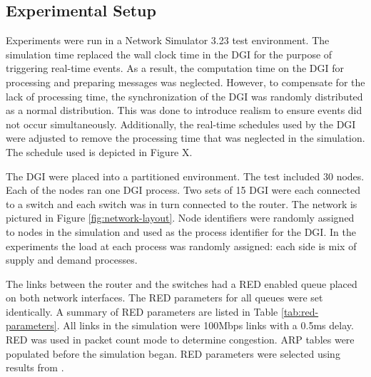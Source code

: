 \subsection{Experimental Setup}
\label{sect:experimentalsetup}

Experiments were run in a Network Simulator 3.23\cite{NS3} test environment.
The simulation time replaced the wall clock time in the \ac{DGI} for the purpose of triggering real-time events.
As a result, the computation time on the \ac{DGI} for processing and preparing messages was neglected.
However, to compensate for the lack of processing time, the synchronization of the \ac{DGI} was randomly distributed as a normal distribution.
This was done to introduce realism to ensure events did not occur simultaneously.
Additionally, the real-time schedules used by the \ac{DGI} were adjusted to remove the processing time that was neglected in the simulation.
The schedule used is depicted in Figure X.

The \ac{DGI} were placed into a partitioned environment.
The test included 30 nodes.
Each of the nodes ran one \ac{DGI} process.
Two sets of 15 \ac{DGI} were each connected to a switch and each switch was in turn connected to the router.
The network is pictured in Figure \ref{fig:network-layout}.
Node identifiers were randomly assigned to nodes in the simulation and used as the process identifier for the \ac{DGI}.
In the experiments the load at each process was randomly assigned: each side is mix of supply and demand processes.

The links between the router and the switches had a \ac{RED} enabled queue placed on both network interfaces.
The \ac{RED} parameters for all queues were set identically.
A summary of \ac{RED} parameters are listed in Table \ref{tab:red-parameters}.
All links in the simulation were 100Mbps links with a 0.5ms delay.
RED was used in packet count mode to determine congestion.
ARP tables were populated before the simulation began.
\ac{RED} parameters were selected using results from \cite{JOURNAL}.

